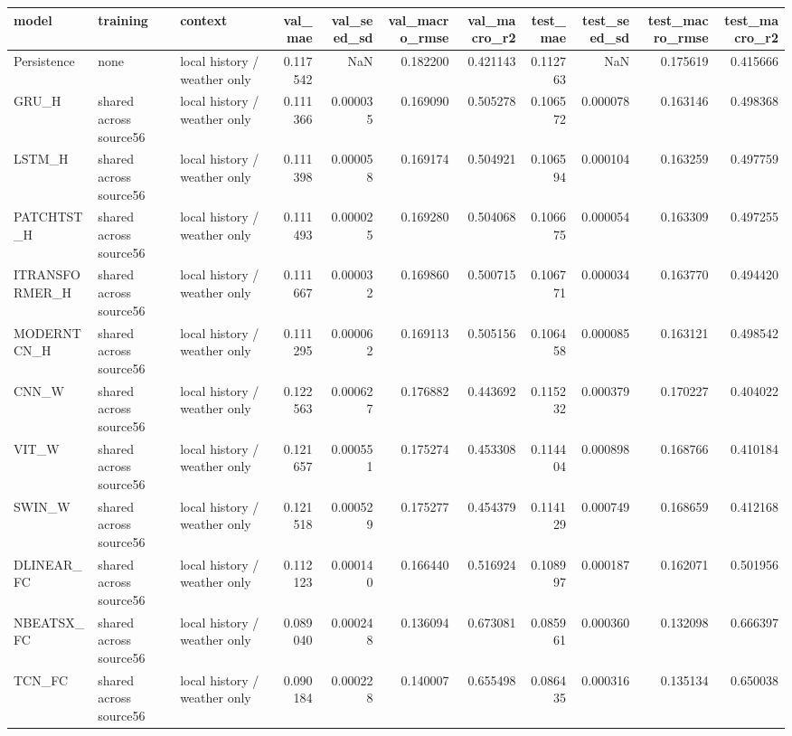 \begin{tabular}{lllrrrrrrrr}
\toprule
model & training & context & val\_mae & val\_seed\_sd & val\_macro\_rmse & val\_macro\_r2 & test\_mae & test\_seed\_sd & test\_macro\_rmse & test\_macro\_r2 \\
\midrule
Persistence & none & local history / weather only & 0.117542 & NaN & 0.182200 & 0.421143 & 0.112763 & NaN & 0.175619 & 0.415666 \\
GRU\_H & shared across source56 & local history / weather only & 0.111366 & 0.000035 & 0.169090 & 0.505278 & 0.106572 & 0.000078 & 0.163146 & 0.498368 \\
LSTM\_H & shared across source56 & local history / weather only & 0.111398 & 0.000058 & 0.169174 & 0.504921 & 0.106594 & 0.000104 & 0.163259 & 0.497759 \\
PATCHTST\_H & shared across source56 & local history / weather only & 0.111493 & 0.000025 & 0.169280 & 0.504068 & 0.106675 & 0.000054 & 0.163309 & 0.497255 \\
ITRANSFORMER\_H & shared across source56 & local history / weather only & 0.111667 & 0.000032 & 0.169860 & 0.500715 & 0.106771 & 0.000034 & 0.163770 & 0.494420 \\
MODERNTCN\_H & shared across source56 & local history / weather only & 0.111295 & 0.000062 & 0.169113 & 0.505156 & 0.106458 & 0.000085 & 0.163121 & 0.498542 \\
CNN\_W & shared across source56 & local history / weather only & 0.122563 & 0.000627 & 0.176882 & 0.443692 & 0.115232 & 0.000379 & 0.170227 & 0.404022 \\
VIT\_W & shared across source56 & local history / weather only & 0.121657 & 0.000551 & 0.175274 & 0.453308 & 0.114404 & 0.000898 & 0.168766 & 0.410184 \\
SWIN\_W & shared across source56 & local history / weather only & 0.121518 & 0.000529 & 0.175277 & 0.454379 & 0.114129 & 0.000749 & 0.168659 & 0.412168 \\
DLINEAR\_FC & shared across source56 & local history / weather only & 0.112123 & 0.000140 & 0.166440 & 0.516924 & 0.108997 & 0.000187 & 0.162071 & 0.501956 \\
NBEATSX\_FC & shared across source56 & local history / weather only & 0.089040 & 0.000248 & 0.136094 & 0.673081 & 0.085961 & 0.000360 & 0.132098 & 0.666397 \\
TCN\_FC & shared across source56 & local history / weather only & 0.090184 & 0.000228 & 0.140007 & 0.655498 & 0.086435 & 0.000316 & 0.135134 & 0.650038 \\

\end{tabular}
